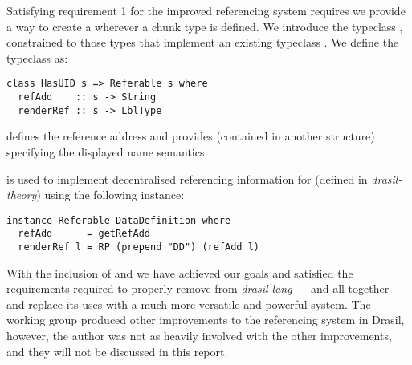 %

Satisfying requirement 1 for the improved referencing system requires we provide a way to create a  wherever a chunk type is defined. We introduce the typeclass , constrained to those types that implement an existing typeclass . We define the typeclass as:

\begin{tcolorbox}
\begin{verbatim}
class HasUID s => Referable s where
  refAdd    :: s -> String
  renderRef :: s -> LblType
\end{verbatim}
\end{tcolorbox}

 defines the reference address and  provides  (contained in another structure) specifying the displayed name semantics.

 is used to implement decentralised referencing information for  (defined in \textit{drasil-theory}) using the following instance:

\begin{tcolorbox}
\begin{verbatim}
instance Referable DataDefinition where
  refAdd      = getRefAdd
  renderRef l = RP (prepend "DD") (refAdd l)
\end{verbatim}
\end{tcolorbox}

With the inclusion of  and  we have achieved our goals and satisfied the requirements required to properly remove  from \textit{drasil-lang} --- and all together --- and replace its uses with a much more versatile and powerful system. The working group produced other improvements to the referencing system in Drasil, however, the author was not as heavily involved with the other improvements, and they will not be discussed in this report.

